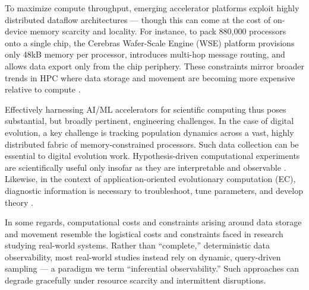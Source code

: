 To maximize compute throughput, emerging accelerator platforms exploit highly distributed dataflow architectures --- though this can come at the cost of on-device memory scarcity and locality.
For instance, to pack 880,000 processors onto a single chip, the Cerebras Wafer-Scale Engine (WSE) platform provisions only 48kB memory per processor, introduces multi-hop message routing, and allows data export only from the chip periphery.
These constraints mirror broader trends in HPC where data storage and movement are becoming more expensive relative to compute \cite{Buluc2021,khan2021analysis,gholami2024ai}.


Effectively harnessing AI/ML accelerators for scientific computing thus poses substantial, but broadly pertinent, engineering challenges.
In the case of digital evolution, a key challenge is tracking population dynamics across a vast, highly distributed fabric of memory-constrained processors.
Such data collection can be essential to digital evolution work.
Hypothesis-driven computational experiments are scientifically useful only insofar as they are interpretable and observable \cite{casti1997wouldbe}.
Likewise, in the context of application-oriented evolutionary computation (EC), diagnostic information is necessary to troubleshoot, tune parameters, and develop theory \cite{hernandez2022dossier,Hooker1995}.

In some regards, computational costs and constraints arising around data storage and movement resemble the logistical costs and constraints faced in research studying real-world systems.
Rather than ``complete,'' deterministic data observability, most real-world studies instead rely on dynamic, query-driven sampling --- a paradigm we term ``inferential observability.''
Such approaches can degrade gracefully under resource scarcity and intermittent disruptions.

